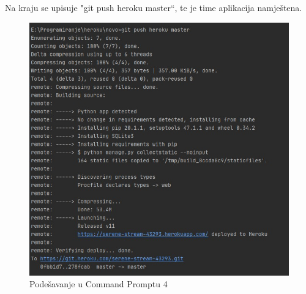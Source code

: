 			\noindent Na kraju se upisuje "git push heroku master“, te je time aplikacija namještena.
			
			\begin{figure}[H]
				\centerfloat
				\includegraphics[scale=0.4]{slike/pustanjeupogon4.jpeg} %
				\caption{Podešavanje u Command Promptu 4}
				
			\end{figure}
			
			\eject 